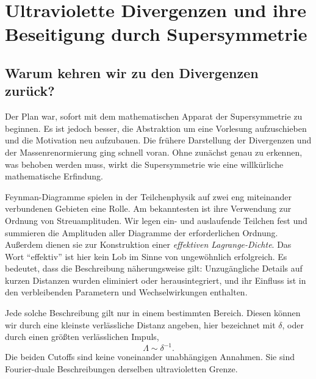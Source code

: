 \chapter{Ultraviolette Divergenzen und ihre Beseitigung durch Supersymmetrie}


\section{Warum kehren wir zu den Divergenzen zurück?}

Der Plan war, sofort mit dem mathematischen Apparat der Supersymmetrie zu beginnen. Es ist jedoch besser, die Abstraktion um eine Vorlesung aufzuschieben und die Motivation neu aufzubauen. Die frühere Darstellung der Divergenzen und der Massenrenormierung ging schnell voran. Ohne zunächst genau zu erkennen, was behoben werden muss, wirkt die Supersymmetrie wie eine willkürliche mathematische Erfindung.

Feynman-Diagramme spielen in der Teilchenphysik auf zwei eng miteinander verbundenen Gebieten eine Rolle. Am bekanntesten ist ihre Verwendung zur Ordnung von Streuamplituden. Wir legen ein- und auslaufende Teilchen fest und summieren die Amplituden aller Diagramme der erforderlichen Ordnung. Außerdem dienen sie zur Konstruktion einer \emph{effektiven Lagrange-Dichte}. Das Wort ``effektiv'' ist hier kein Lob im Sinne von ungewöhnlich erfolgreich. Es bedeutet, dass die Beschreibung näherungsweise gilt: Unzugängliche Details auf kurzen Distanzen wurden eliminiert oder herausintegriert, und ihr Einfluss ist in den verbleibenden Parametern und Wechselwirkungen enthalten.

Jede solche Beschreibung gilt nur in einem bestimmten Bereich. Diesen können wir durch eine kleinste verlässliche Distanz angeben, hier bezeichnet mit \(\delta\), oder durch einen größten verlässlichen Impuls,
\begin{equation}
\Lambda\sim \delta^{-1}.
\end{equation}
Die beiden Cutoffs sind keine voneinander unabhängigen Annahmen. Sie sind Fourier-duale Beschreibungen derselben ultravioletten Grenze.

